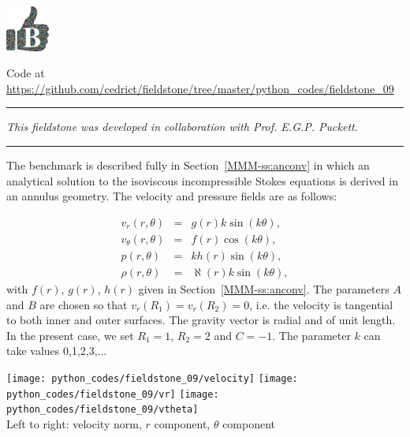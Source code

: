 
\includegraphics[height=1.5cm]{images/pictograms/benchmark}



\begin{center}
Code at \url{https://github.com/cedrict/fieldstone/tree/master/python_codes/fieldstone_09}
\end{center}

\par\noindent\rule{\textwidth}{0.4pt}

{\sl This fieldstone was developed in collaboration with Prof. E.G.P. Puckett}. 

\par\noindent\rule{\textwidth}{0.4pt}

The benchmark is described fully in Section~\ref{MMM-ss:anconv} in which 
an analytical solution to the isoviscous incompressible Stokes equations 
is derived in an annulus geometry.
The velocity and pressure fields are as follows:

\begin{eqnarray}
v_r(r,\theta)     &=&  g(r) k \sin(k\theta), \\
v_\theta(r,\theta)&=&  f(r) \cos(k \theta), \\ 
p(r,\theta)       &=&  k h(r) \sin(k \theta), \\
\rho (r,\theta)   &=& \aleph(r) k \sin (k \theta), 
\end{eqnarray}
with $f(r)$, $g(r)$, $h(r)$ given in Section~\ref{MMM-ss:anconv}.
The parameters $A$ and $B$ are chosen so that $v_r(R_1)=v_r(R_2)=0$, i.e.
the velocity is tangential to both inner and outer surfaces.
The gravity vector is radial and of unit length.
In the present case, we set $R_1=1$, $R_2=2$ and $C=-1$.
The parameter $k$ can take values 0,1,2,3,... 

\begin{center}
\texttt{[image: python\_codes/fieldstone\_09/velocity]}
\texttt{[image: python\_codes/fieldstone\_09/vr]}
\texttt{[image: python\_codes/fieldstone\_09/vtheta]}\\
{\small Left to right: velocity norm, $r$ component, $\theta$ component}
\end{center}

